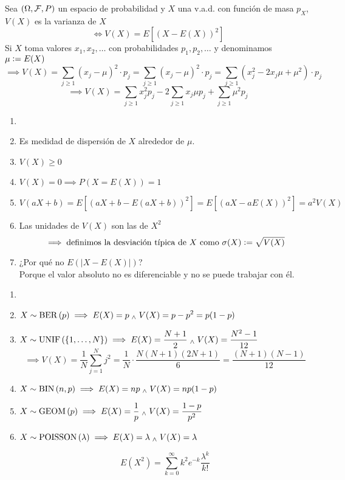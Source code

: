 \begin{defn}
	Sea $(\Omega, \mathcal{F}, P)$ un espacio de probabilidad y $X$ una v.a.d. con función de masa $p_X$, $V(X)$ es la varianza de $X$
	\[\iff V(X)=E\left[(X-E(X))^2\right]\] 
	Si $X$ toma valores $x_1, x_2, \dots$ con probabilidades $p_1, p_2, \dots$ y denominamos $\mu \vcentcolon= E(X)$
	\[\implies V(X)=\sum_{j\geq 1}(x_j-\mu)^2\cdot p_j = \sum_{j\geq 1}(x_j-\mu)^2\cdot p_j = \sum_{j\geq 1}(x_j^2-2x_j\mu+\mu^2)\cdot p_j\]
	\[\implies V(X)=\sum_{j\geq 1}x_j^2p_j -2\sum_{j\geq 1}x_j\mu p_j +\sum_{j\geq 1}\mu^2p_j\]
\end{defn}

\begin{obs}
	\begin{enumerate}
		\item[] 
		\item Es medidad de dispersión de $X$ alrededor de $\mu$.
		\item $V(X)\geq 0$
		\item $V(X)=0\implies P(X=E(X))=1$
		\item $V(aX+b)=E[(aX+b-E(aX+b))^2]=E[(aX-aE(X))^2]=a^2V(X)$
		\item Las unidades de $V(X)$ son las de $X^2$ $$\implies \text{definimos la desviación típica de $X$ como } \sigma(X)\vcentcolon=\sqrt{V(X)}$$
		\item ¿Por qué no $E(|X-E(X)|)$? \\
		Porque el valor absoluto no es diferenciable y no se puede trabajar con él.
	\end{enumerate}
\end{obs}

\begin{ejem}
	\begin{enumerate}
		\item[]
		\item $\displaystyle X\sim\operatorname{BER}\left(p\right) \implies E(X)=p \; _{\wedge} \; V(X)=p-p^2=p(1-p)$
		\item $\displaystyle X\sim \operatorname{UNIF}\left(\{1, \dots, N\}\right) \implies E(X)=\frac{N+1}{2} \; _{\wedge} \; V(X)=\frac{N^2-1}{12}$
		\[\implies V(X)=\frac{1}{N}\sum_{j=1}^N j^2=\frac{1}{N}\cdot\frac{N(N+1)(2N+1)}{6}=\frac{(N+1)(N-1)}{12}\]
		\item $\displaystyle X\sim\operatorname{BIN}\left(n, p\right) \implies E(X)=np \; _{\wedge} \; V(X)=np(1-p)$
		\begin{dem}
			
		\end{dem}
		\item $\displaystyle X\sim\operatorname{GEOM}\left(p\right) \implies E(X)=\frac{1}{p} \; _{\wedge} \; V(X)=\frac{1-p}{p^2}$
		\begin{dem}
			
		\end{dem}
		\item $X\sim\operatorname{POISSON}\left(\lambda\right) \implies E(X)=\lambda \; _{\wedge} \; V(X)=\lambda$
		\begin{dem}
			\[E(X^2)=\sum_{k=0}^{\infty} k^2 e^{-k}\frac{\lambda^k}{k!}\]
		\end{dem}
	\end{enumerate}
\end{ejem}

